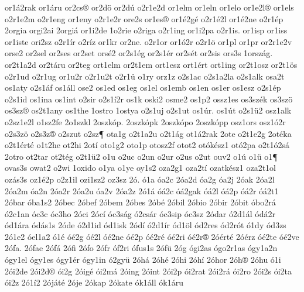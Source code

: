 {or1^^e12rak
or1^^e1ru
or2cs^^ae
or2d^^f6
or2d^^fa
o2r1e2d
or1elm
or1eln
or1elo
or1e2l^^ae
or1els
o2r1e2m
o2r1eng
or1eny
o2r1e2r
ore2s
or1es^^ae
or1^^e92g^^e9
o2r1^^e92l
or1^^e92ne
o2r1^^e9p
2orgia
orgi2ai
2orgi^^e1
or1i2de
1o2rie
o2riga
o2r1ing
or1i2pa
o2r1is.
or1isp
or1iss
or1iste
ori2sz
o2r1^^edr
o2r^^edz
or1kr
or2ne.
o2r1or
or1^^f32r
o2r1^^f6
or1pl
or1pr
or2r1e2v
orse2
or2sel
or2ses
or2set
ors^^e92
or2s1^^e9g
or2s1^^e9r
or2s^^e9t
or2sis
ors3s
1orsz^^e1g.
or2t1a2d
or2t^^e1ru
or2teg
ort1elm
or2t1em
ort1esz
ort1^^e9rt
ort1ing
or2t1osz
or2t1^^f6s
o2r1ud
o2r1ug
or1u2r
o2r1u2t
o2r1^^fc
o1ry
orz1z
o2s1ac
o2s1a2la
o2s1alk
osa2t
os1aty
o2s1^^e1f
os1^^e1ll
ose2
os1ed
os1eg
os1el
os1emb
os1en
os1er
os1esz
o2s1^^e9p
o2s1id
os1ina
os1int
o2sir
o2s1^^ed2r
os1k
oski2
osme2
os1p2
ossz1es
os3sz^^e9k
os3sz^^f6
os3sz^^ae
os2t1any
os1the
1ostro
1ostya
o2s1uj
o2s1ut
os1^^far.
os1^^fat
o2s1^^fc2
osz1alk
o2sz1e2l
o1sz2fe
2o1szkl
2oszk^^f3p.
2oszk^^f3pk
2oszk^^f3po
2oszk^^f3pp
osz1ors
osz1^^f32r
o2s3z^^f6
o2s3z^^ae
o2szut
o2sz^^b6
ota1g
o2t1a2u
o2t1^^e1g
ot1^^e12rak
2ote
o2t1e2g
2ot^^e9ka
o2t1^^e9rt^^e9
o1t2he
ot2hi
2ot^^ed
oto1g2
oto1p
otosz2f
otot2
ot^^f3k^^e9sz1
ot^^f32pa
o2t1^^f32s^^e1
2otro
ot2tar
ot2t^^e9g
o2t1^^fc2
o1u
o2uc
o2un
o2ur
o2us
o2ut
ouv2
o1^^fa
o1^^fc
o1^^b6
ovas3s
owat2
o2wi
1oxido
o1ya
o1ye
oy1s2
oza2g1
oza2t^^ed
ozatk^^e9sz1
oza2t1ol
oz^^e1s3s
oz1^^e92p
o2z1il
ozi1sz2
oz3sz
2^^f3.
^^f31a
^^f3a2c
2^^f3a2d
^^f3a2g
^^f3a2j
2^^f3ak
2^^f3a2l
2^^f3a2m
^^f3a2n
2^^f3a2r
2^^f3a2u
^^f3a2v
2^^f3a2z
2^^f31^^e1
^^f3^^e12c
^^f3^^e12gak
^^f3^^e12l
^^f3^^e12p
^^f3^^e12r
^^f3^^e12t1
2^^f3bar
^^f3ba1s2
2^^f3bec
2^^f3bef
2^^f3bem
2^^f3bes
2^^f3b^^e9
2^^f3bil
2^^f3bio
2^^f3bir
2^^f3bit
^^f3bo2r^^e1
^^f32c1an
^^f3c3c
^^f3c3ho
2^^f3ci
2^^f3c^^ed
^^f3c3s^^e1g
^^f32cs^^e1r
^^f3c3sip
^^f3c3sz
2^^f3dar
^^f32d1^^e1l
^^f3d^^e12r
^^f3d1^^e1ra
^^f3d^^e1s1s
2^^f3de
^^f32d1id
^^f3d1isk
2^^f3d^^ed
^^f32d1^^edr
^^f3d1^^f6l
^^f3d2res
^^f3d2r^^f3t
^^f31dy
^^f3d3zs
2^^f31e2
^^f3el1a2
^^f31^^e9
^^f3^^e92g
^^f3^^e92l
^^f3^^e92ne
^^f3^^e92p
^^f3^^e92r^^e9
^^f3^^e92ri
^^f3^^e92r^^ae
2^^f3^^e9rt^^e9
2^^f3^^e9rz
^^f3^^e92te
^^f3^^e92ve
2^^f3fa.
2^^f3fae
2^^f3f^^e1
2^^f3fi
2^^f3fo
2^^f3fr
^^f3f2ri
^^f3fus1s
2^^f3f^^fc
2^^f3g
^^f3gi2as
^^f3go2r1as
^^f3gy1a2n
^^f3gy1el
^^f3gy1es
^^f3gy1^^e9r
^^f3gy1in
^^f32gy^^fc
2^^f3h^^e1
2^^f3h^^e9
2^^f3hi
2^^f3h^^ed
2^^f3hor
2^^f3h^^ae
2^^f3hu
^^f31i
2^^f3i2de
2^^f3i2d^^ae
^^f3i2g
2^^f3ig^^e9
^^f3i2m^^e1
2^^f3ing
2^^f3int
2^^f3i2p
^^f3i2rat
2^^f3i2r^^e1
^^f3i2ro
2^^f3i2s
^^f3i2ta
^^f3i2z
2^^f31^^ed2
2^^f3j^^e1t^^e9
2^^f3je
2^^f3kap
2^^f3kate
^^f3k1^^e1ll
^^f3k1^^e1ru
}

